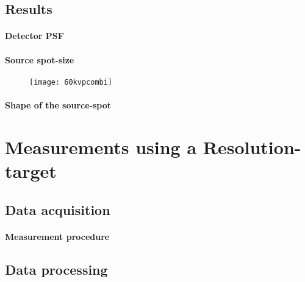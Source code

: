 \subsection{Results}\label{subsec:edgeresults}
\paragraph{Detector PSF}

\paragraph{Source spot-size}
\begin{figure}
	\begin{center}
		\texttt{[image: 60kvpcombi]}
	\end{center}
\end{figure}
\paragraph{Shape of the source-spot}





\section{Measurements using a Resolution-target}\label{sec:targetmeasurements}
\subsection{Data acquisition}\label{subsec:targetdata}
\paragraph{Measurement procedure}
\subsection{Data processing}\label{subsec:targetprocessing}